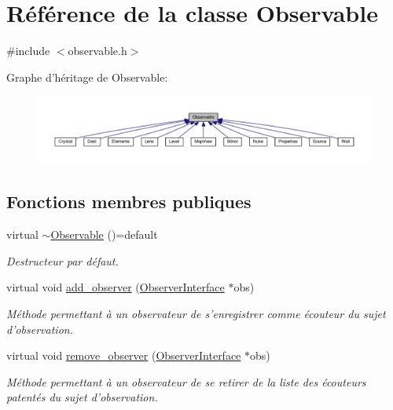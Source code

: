 \hypertarget{classObservable}{\section{Référence de la classe Observable}
\label{classObservable}
}


{\ttfamily \#include $<$observable.\+h$>$}



Graphe d'héritage de Observable\+:\nopagebreak
\begin{figure}[H]
\begin{center}
\leavevmode
\includegraphics[width=350pt]{d7/d7e/classObservable__inherit__graph}
\end{center}
\end{figure}
\subsection*{Fonctions membres publiques}
\begin{DoxyCompactItemize}
\item 
\hypertarget{classObservable_a058acb5a674eba2b96648c66a27440d8}{virtual \hyperlink{classObservable_a058acb5a674eba2b96648c66a27440d8}{$\sim$\+Observable} ()=default}\label{classObservable_a058acb5a674eba2b96648c66a27440d8}

\begin{DoxyCompactList}\small\item\em Destructeur par défaut. \end{DoxyCompactList}\item 
virtual void \hyperlink{classObservable_a4d816915e134f1585a3f4151c6d74b1f}{add\+\_\+observer} (\hyperlink{classObserverInterface}{Observer\+Interface} $\ast$obs)
\begin{DoxyCompactList}\small\item\em Méthode permettant à un observateur de s'enregistrer comme écouteur du sujet d'observation. \end{DoxyCompactList}\item 
virtual void \hyperlink{classObservable_a79bdffc61fbea9b16d00d5bc6a2289ad}{remove\+\_\+observer} (\hyperlink{classObserverInterface}{Observer\+Interface} $\ast$obs)
\begin{DoxyCompactList}\small\item\em Méthode permettant à un observateur de se retirer de la liste des écouteurs patentés du sujet d'observation. \end{DoxyCompactList}\end{DoxyCompactItemize}
